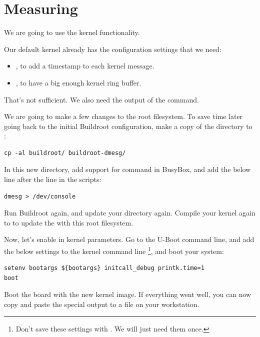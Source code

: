 
\section{Measuring}

We are going to use the kernel  functionality.

Our default kernel already has the configuration settings that we need:
\begin{itemize}
\item {}, to add a timestamp to each kernel
message.
\item {}, to have a big enough kernel ring buffer.
\end{itemize}

That's not sufficient. We also need the output of the 
command.

We are going to make a few changes to the root filesystem. To save time
later going back to the initial Buildroot configuration, make a copy
of the  directory to :

\begin{verbatim}
cp -al buildroot/ buildroot-dmesg/
\end{verbatim}

In this new directory, add support for  command in BusyBox,
and add the below line after the  line in the
 scripts:

\begin{verbatim}
dmesg > /dev/console
\end{verbatim}

Run Buildroot again, and update your
 directory again. Compile your
kernel again to to update the  with this root filesystem.

Now, let's enable  in kernel parameters. Go to
the U-Boot command line, and add the below settings to the kernel command line
\footnote{Don't save these settings with . We
will just need them once.}, and boot your system:
\begin{verbatim}
setenv bootargs ${bootargs} initcall_debug printk.time=1
boot
\end{verbatim}

Boot the board with the new kernel image. If everything went well,
you can now copy and paste the special  output to
a  file on your workstation.


